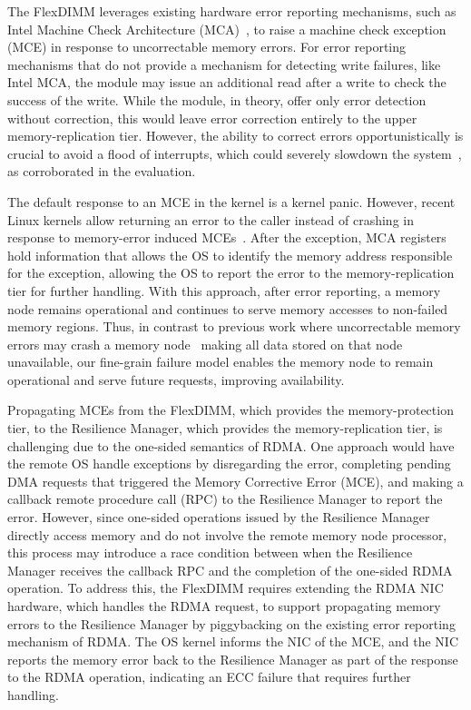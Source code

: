 The FlexDIMM leverages existing hardware error reporting mechanisms, such as Intel Machine Check Architecture (MCA)~\cite{intel:mce:book:2024}, to raise a machine check exception (MCE) in response to uncorrectable memory errors.
For error reporting mechanisms that do not provide a mechanism for detecting write failures, like Intel MCA, the module may issue an additional read after a write to check the success of the write.
While the module, in theory, offer only error detection without correction, this would leave error correction entirely to the upper memory-replication tier. 
However, the ability to correct errors opportunistically is crucial to avoid a flood of interrupts, which could severely slowdown the system~\cite{meza:dramfailures:dsn:2015}, as corroborated in the evaluation.

The default response to an MCE in the kernel is a kernel panic. However, recent Linux kernels allow returning an error to the caller instead of crashing in response to memory-error induced MCEs~\cite{xu:nova-fortis:sosp:2017}.
After the exception, MCA registers hold information that allows the OS to identify the memory address responsible for the exception, allowing the OS to report the error to the memory-replication tier for further handling.
With this approach, after error reporting, a memory node remains operational and continues to serve memory accesses to non-failed memory regions.
Thus, in contrast to previous work where uncorrectable memory errors may crash a memory node~\cite{shan:legoos:osdi:2018} making all data stored on that node unavailable, our fine-grain failure model enables the memory node to remain operational and serve future requests, improving availability.

Propagating MCEs from the FlexDIMM, which provides the memory-protection tier, to the Resilience Manager, which provides the memory-replication tier, is challenging due to the one-sided semantics of RDMA. 
One approach would have the remote OS handle exceptions by disregarding the error, completing pending DMA requests that triggered the Memory Corrective Error (MCE), and making a callback remote procedure call (RPC) to the Resilience Manager to report the error. 
However, since one-sided operations issued by the Resilience Manager directly access memory and do not involve the remote memory node processor, this process may introduce a race condition between when the Resilience Manager receives the callback RPC and the completion of the one-sided RDMA operation. 
To address this, the FlexDIMM requires extending the RDMA NIC hardware, which handles the RDMA request, to support propagating memory errors to the Resilience Manager by piggybacking on the existing error reporting mechanism of RDMA. 
The OS kernel informs the NIC of the MCE, and the NIC reports the memory error back to the Resilience Manager as part of the response to the RDMA operation, indicating an ECC failure that requires further handling. 

